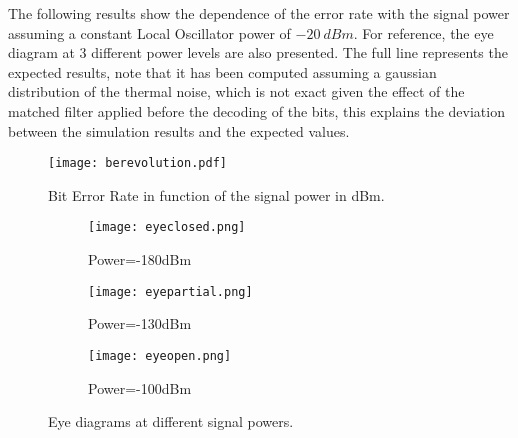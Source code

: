 The following results show the dependence of the error rate with the signal power assuming a constant Local Oscillator power of $-20~dBm$. For reference, the eye diagram at 3 different power levels are also presented. The full line represents the expected results, note that it has been computed assuming a gaussian distribution of the thermal noise, which is not exact given the effect of the matched filter applied before the decoding of the bits, this explains the deviation between the simulation results and the expected values.

\begin{figure}[H]
\centering
\texttt{[image: berevolution.pdf]}
\caption{Bit Error Rate in function of the signal power in dBm.}
\label{fig:berevolution}
\end{figure}

\begin{figure}[H]
\centering
\begin{subfigure}{.3\linewidth}
\texttt{[image: eyeclosed.png]}
\caption{Power=-180dBm}
\end{subfigure}
\begin{subfigure}{.3\linewidth}
\texttt{[image: eyepartial.png]}
\caption{Power=-130dBm}
\end{subfigure}
\begin{subfigure}{.3\linewidth}
\texttt{[image: eyeopen.png]}
\caption{Power=-100dBm}
\end{subfigure}
\caption{Eye diagrams at different signal powers.}
\end{figure}



